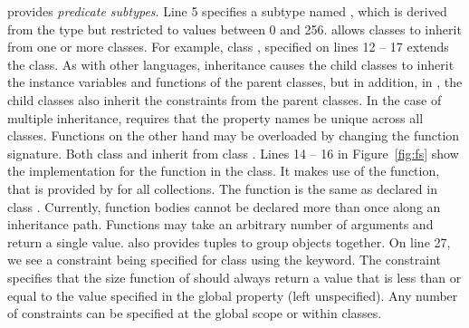 \noindent \Klang{} provides {\em predicate subtypes}. Line 5 specifies
a subtype named , which is derived from the  type
but restricted to values between 0 and 256. \Klang{} allows classes to
inherit from one or more classes. For example, class ,
specified on lines 12 -- 17 extends the  class. As with
other languages, inheritance causes the child classes to inherit the
instance variables and functions of the parent classes, but in
addition, in \Klang{}, the child classes also inherit the constraints
from the parent classes. In the case of multiple inheritance, \Klang{}
requires that the property names be unique across all
classes. Functions on the other hand may be overloaded by changing the
function signature. Both class  and  inherit from
class . Lines 14 -- 16 in Figure~\ref{fig:fs} show the
implementation for the  function in the 
class. It makes use of the  function, that is provided by
\Klang{} for all collections. The  function is the same as
declared in class . Currently, function bodies cannot be
declared more than once along an inheritance path. Functions may take
an arbitrary number of arguments and return a single value. \Klang{}
also provides tuples to group objects together. On line 27, we
see a constraint being specified for class  using the
 keyword. The constraint specifies that the size function of
 should always return a value that is less than or equal
to the value specified in the global property 
(left unspecified). Any number of constraints can be specified at the
global scope or within classes.

